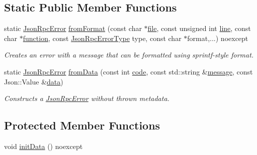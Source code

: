 \subsection*{Static Public Member Functions}
\begin{DoxyCompactItemize}
\item 
static \hyperlink{classdg_1_1deepcore_1_1network_1_1_json_rpc_error}{Json\+Rpc\+Error} \hyperlink{group___network_module_ga2fdfe2154c20e91cb5f0205ced658714}{from\+Format} (const char $\ast$\hyperlink{group___utility_module_ga0b75e32780cb8534179ff3c060739496}{file}, const unsigned int \hyperlink{group___utility_module_ga13437b5caffe754b7a32fc3c514907e5}{line}, const char $\ast$\hyperlink{group___utility_module_gaa69c98222c56544a9094154a8eab4db9}{function}, const \hyperlink{namespacedg_1_1deepcore_1_1network_a396e76c62ff66c95c20af09d8e45ce44}{Json\+Rpc\+Error\+Type} type, const char $\ast$format,...) noexcept
\begin{DoxyCompactList}\small\item\em Creates an error with a message that can be formatted using sprintf-\/style format. \end{DoxyCompactList}\item 
static \hyperlink{classdg_1_1deepcore_1_1network_1_1_json_rpc_error}{Json\+Rpc\+Error} \hyperlink{group___network_module_gaef99638ab60920c9af55d3c15349119f}{from\+Data} (const int \hyperlink{group___network_module_gab5f760ae09f901ed94e08ea1c0d26e50}{code}, const std\+::string \&\hyperlink{group___utility_module_ga7269ba8049ed86338733955565242539}{message}, const Json\+::\+Value \&\hyperlink{group___network_module_ga30e099cc04ea022587d643d2c93bb0e9}{data})
\begin{DoxyCompactList}\small\item\em Constructs a \hyperlink{classdg_1_1deepcore_1_1network_1_1_json_rpc_error}{Json\+Rpc\+Error} without thrown metadata. \end{DoxyCompactList}\end{DoxyCompactItemize}
\subsection*{Protected Member Functions}
\begin{DoxyCompactItemize}
\item 
void \hyperlink{classdg_1_1deepcore_1_1network_1_1_json_rpc_error_a50717ff2c062ffb255c045ab41f57440}{init\+Data} () noexcept
\end{DoxyCompactItemize}


